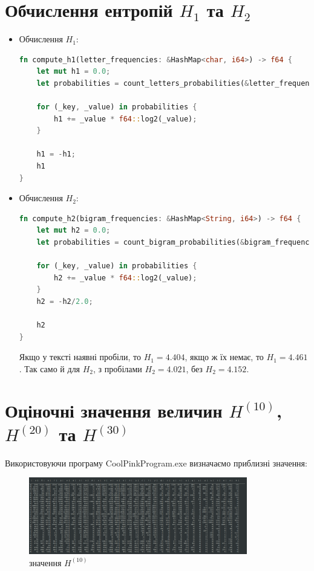 \documentclass[12pt]{article}
\begin{document}
\section{Обчислення ентропій \(H_1\) та \(H_2\)}
\begin{itemize}
    \item Обчислення \(H_1\):
\begin{lstlisting}[language=Rust]
fn compute_h1(letter_frequencies: &HashMap<char, i64>) -> f64 {
    let mut h1 = 0.0;
    let probabilities = count_letters_probabilities(&letter_frequencies);

    for (_key, _value) in probabilities {
        h1 += _value * f64::log2(_value);
    }

    h1 = -h1;
    h1
}
\end{lstlisting}

\newpage
    \item Обчислення \(H_2\):
\begin{lstlisting}[language=Rust]
fn compute_h2(bigram_frequencies: &HashMap<String, i64>) -> f64 {
    let mut h2 = 0.0;
    let probabilities = count_bigram_probabilities(&bigram_frequencies);

    for (_key, _value) in probabilities {
        h2 += _value * f64::log2(_value);
    }
    h2 = -h2/2.0;
    
    h2
}
\end{lstlisting}
Якщо у тексті наявні пробіли, то \(H_1 = 4.404\), якщо ж їх немає, то \(H_1 = 4.461\). 
Так само й для \(H_2\), з пробілами \(H_2 = 4.021\), без \(H_2 = 4.152\).
\end{itemize}

\newpage
\section{Оціночні значення величин \(H^{(10)}\), \(H^{(20)}\) та \(H^{(30)}\)}
\quad Використовуючи програму CoolPinkProgram.exe визначаємо приблизні значення:
\begin{figure}[htbp]
    \centering
    \includegraphics[width=0.85\textwidth]{screenshots/bigram_freq_without_space.png}
    \caption{значення \(H^{(10)}\)}
    \label{fig:screenshot}
\end{figure}
\end{document}
